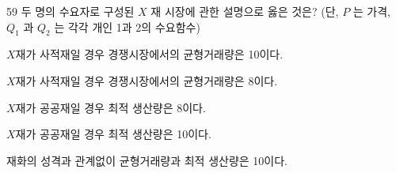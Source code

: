 \begin{question}{59}
두 명의 수요자로 구성된 $X$ 재 시장에 관한 설명으로 옳은 것은? (단, $P$ 는 가격, $Q_{1}$ 과 $Q_{2}$ 는 각각 개인 1과 2의 수요함수)
\par\noindent{}
\begin{choices}
  \item $X$재가 사적재일 경우 경쟁시장에서의 균형거래량은 10이다.
  \item $X$재가 사적재일 경우 경쟁시장에서의 균형거래량은 8이다.
  \item $X$재가 공공재일 경우 최적 생산량은 8이다.
  \item $X$재가 공공재일 경우 최적 생산량은 10이다.
  \item 재화의 성격과 관계없이 균형거래량과 최적 생산량은 10이다.
\end{choices}
\end{question}
